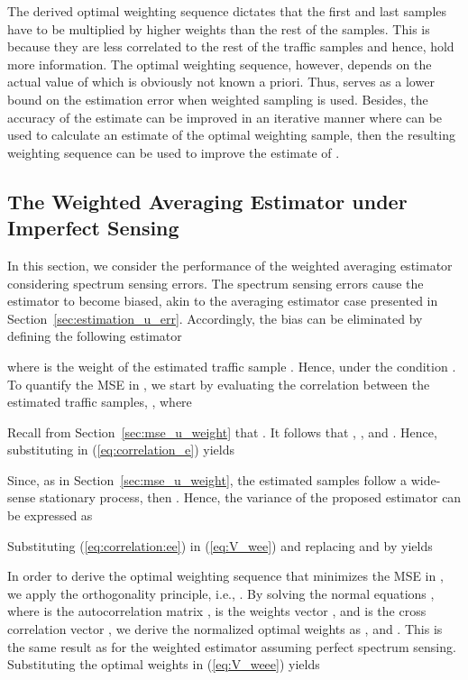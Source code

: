 \documentclass[11pt,draftclsnofoot,journal,onecolumn]{IEEEtran}
\begin{document}
The derived optimal weighting sequence dictates that the first and last samples have to be multiplied by higher weights than the rest of the samples. This is because they are less correlated to the rest of the traffic samples and hence, hold more information. The optimal weighting sequence, however, depends on the actual value of  which is obviously not known a priori. Thus,  serves as a lower bound on the estimation error when weighted sampling is used. Besides, the accuracy of the estimate can be improved in an iterative manner where  can be used to calculate an estimate of the optimal weighting sample, then the resulting weighting sequence can be used to improve the estimate of .

\subsection{The Weighted Averaging Estimator under Imperfect Sensing}

In this section, we consider the performance of the weighted averaging estimator considering spectrum sensing errors. The spectrum sensing errors cause the estimator to become biased, akin to the averaging estimator case presented in Section~\ref{sec:estimation_u_err}. Accordingly, the bias can be eliminated by defining the following estimator

where  is the weight of the estimated traffic sample . Hence,  under the condition . To quantify the MSE in , we start by evaluating the correlation between the estimated traffic samples, , where

Recall from Section~\ref{sec:mse_u_weight} that . It follows that , , and . Hence, substituting in (\ref{eq:correlation_e}) yields

Since, as in Section~\ref{sec:mse_u_weight}, the estimated samples follow a wide-sense stationary process, then . Hence, the variance of the proposed estimator can be expressed as

Substituting (\ref{eq:correlation:ee}) in (\ref{eq:V_wee}) and replacing  and  by  yields

In order to derive the optimal weighting sequence that minimizes the MSE in , we apply the orthogonality principle, i.e., . By solving the normal equations , where  is the autocorrelation matrix ,  is the weights vector , and  is the cross correlation vector , we derive the normalized optimal weights as , and . This is the same result as for the weighted estimator assuming perfect spectrum sensing. Substituting the optimal weights in (\ref{eq:V_weee}) yields
\end{document}
